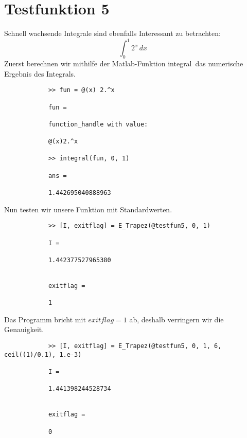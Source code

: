 \documentclass[11pt,titlepage]{article}
\begin{document}
	\section{Testfunktion 5}
		Schnell wachsende Integrale sind ebenfalls Interessant zu betrachten:
		\begin{displaymath}
			\int_{0}^1 2^x \, dx\
		\end{displaymath}
		Zuerst berechnen wir mithilfe der Matlab-Funktion \glqq integral\grqq \, das numerische Ergebnis des Integrals.
		\begin{lstlisting}
			>> fun = @(x) 2.^x
			
			fun =
			
			function_handle with value:
			
			@(x)2.^x
			
			>> integral(fun, 0, 1)
			
			ans =
			
			1.442695040888963
		\end{lstlisting}
		Nun testen wir unsere Funktion mit Standardwerten.
		\begin{lstlisting}
			>> [I, exitflag] = E_Trapez(@testfun5, 0, 1)
			
			I =
			
			1.442377527965380
			
			
			exitflag =
			
			1
		\end{lstlisting}
		Das Programm bricht mit $exitflag = 1$ ab, deshalb verringern wir die Genauigkeit.
		\begin{lstlisting}
			>> [I, exitflag] = E_Trapez(@testfun5, 0, 1, 6, ceil((1)/0.1), 1.e-3)
			
			I =
			
			1.441398244528734
			
			
			exitflag =
			
			0
		\end{lstlisting}
\end{document}
